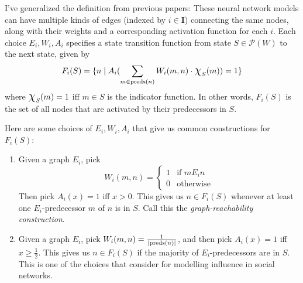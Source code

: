 \documentclass[letterpaper]{article}
\begin{document}
I've generalized the definition from previous papers: These neural network models can have multiple kinds of edges (indexed by $i \in \textbf{I}$) connecting the same nodes, along with their weights and a corresponding activation function for each $i$.  Each choice $E_i, W_i, A_i$ specifies a state transition function from state $S \in \mathcal{P}(W)$ to the next state, given by
\[
    F_i(S) = \{ n \mid A_i(\sum_{m \in \mathrm{preds}(n)} W_i(m, n) \cdot \mbox{\Large$\chi$}_S(m)) = 1 \}
\]
where $\mbox{\Large$\chi$}_S(m) = 1$ iff $m \in S$ is the indicator function.  In other words, $F_i(S)$ is the set of all nodes that are activated by their predecessors in $S$.



\begin{example*}
    Here are some choices of $E_i, W_i, A_i$ that give us common constructions for $F_i(S)$:
    \begin{enumerate}
        \item Given a graph $E_i$, pick 
        \[
            W_i(m, n) = 
            \begin{cases}
                1 & \mbox{if } m{E_i}n \\
                0 & \mbox{otherwise}
            \end{cases}
        \]
        Then pick $A_i(x) = 1$ iff $x > 0$. This gives us $n \in F_i(S)$ whenever at least one $E_i$-predecessor $m$ of $n$ is in $S$.  Call this the \emph{graph-reachability construction}.
        
        \item Given a graph $E_i$, pick $W_i(m, n) = \frac{1}{|\mathrm{preds}(n)|}$, and then pick $A_i(x) = 1$ iff $x \geq \frac{1}{2}$.  This gives us $n \in F_i(S)$ if the majority of $E_i$-predecessors are in $S$.  This is one of the choices that \cite{baltag2019socialnetworks} consider for modelling influence in social networks.
    \end{enumerate}
\end{example*}
\end{document}
